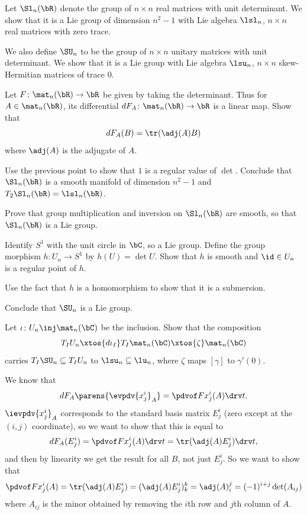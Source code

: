 \bprob

    Let $\Sl_n(\bR)$ denote the group of $n\times n$ real matrices with unit determinant.
    We show that it is a Lie group of dimension $n^2-1$ with Lie algebra $\lsl_n$, $n\times n$ real matrices with zero trace.

    We also define $\SU_n$ to be the group of $n\times n$ unitary matrices with unit determinant.
    We show that it is a Lie group with Lie algebra $\lsu_n$, $n\times n$ skew-Hermitian matrices of trace $0$.
    \benum
        \item Let $F\colon\mat_n(\bR)\to\bR$ be given by taking the determinant.
        Thus for $A\in\mat_n(\bR)$, its differential $dF_A\colon\mat_n(\bR)\to\bR$ is a linear map.
        Show that
        $$ dF_A(B) = \tr(\adj(A)B) $$
        where $\adj(A)$ is the adjugate of $A$.

        \item Use the previous point to show that $1$ is a regular value of $\det$.
        Conclude that $\Sl_n(\bR)$ is a smooth manifold of dimension $n^2-1$ and $T_2\Sl_n(\bR)=\lsl_n(\bR)$.

        \item Prove that group multiplication and inversion on $\Sl_n(\bR)$ are smooth, so that $\Sl_n(\bR)$ is a Lie group.

        \item Identify $S^1$ with the unit circle in $\bC$, so a Lie group.
        Define the group morphism $h\colon U_n\to S^1$ by $h(U)=\det U$.
        Show that $h$ is smooth and $\id\in U_n$ is a regular point of $h$.

        \item Use the fact that $h$ is a homomorphism to show that it is a submersion.

        \item Conclude that $\SU_n$ is a Lie group.

        \item Let $\iota\colon U_n\inj\mat_n(\bC)$ be the inclusion.
        Show that the composition
        $$ T_IU_n \xtos{d\iota_I} T_I\mat_n(\bC) \xtos{\zeta} \mat_n(\bC) $$
        carries $T_I\SU_n\subseteq T_IU_n$ to $\lsu_n\subseteq\lu_n$, where $\zeta$ maps $[\gamma]$ to $\gamma'(0)$.
    \eenum

\eprob

\benum
    \item We know that
    $$ dF_A\parens{\evpdv{x^i_j}_A} = \pdvof F{x^i_j}(A)\drv t . $$
    $\ievpdv{x^i_j}_A$ corresponds to the standard basis matrix $E^i_j$ (zero except at the $(i,j)$ coordinate), so we want to show that
    this is equal to
    $$ dF_A(E^i_j) = \pdvof F{x^i_j}(A)\drv t = \tr(\adj(A)E^i_j)\drv t , $$
    and then by linearity we get the result for all $B$, not just $E^i_j$.
    So we want to show that
    $$ \pdvof F{x^i_j}(A) = \tr(\adj(A)E^i_j) = (\adj(A)E^i_j)^k_k = \adj(A)^j_i = (-1)^{i+j}\det(A_{ij}) $$
    where $A_{ij}$ is the minor obtained by removing the $i$th row and $j$th column of $A$.

